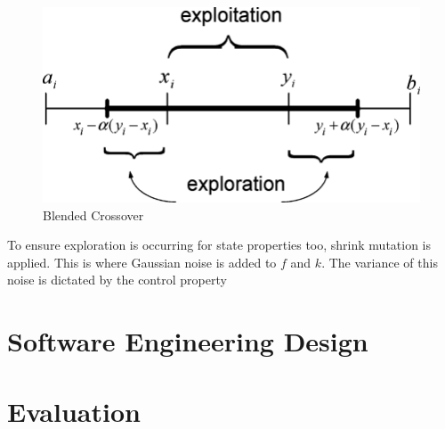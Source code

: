 \begin{figure}[!h]
\centering
    \includegraphics[width=.5\textwidth]{images/blx.png}
    \caption{Blended Crossover \cite{abido2006multiobjective}}
\label{fig:blx-alpha}
\end{figure}

To ensure exploration is occurring for state properties too, shrink mutation is applied. This is where Gaussian noise is added to $f$ and $k$. The variance of this noise is dictated by the control property 





\section{Software Engineering Design}

\section{Evaluation}